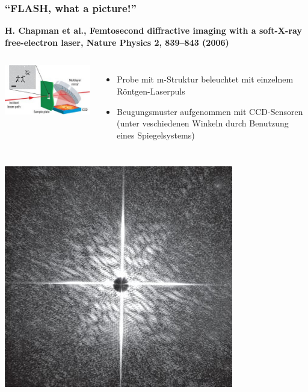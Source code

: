 \documentclass[10pt,t]{beamer}
\begin{document}
\begin{frame}
\frametitle{``FLASH, what a picture!''}
\vspace*{-2.6\baselineskip}
\alert{\bfseries\footnotesize H. Chapman et al., Femtosecond diffractive imaging with a soft-X-ray free-electron laser, Nature Physics 2, 839--843 (2006) \cite{Chapman2006}}
\vspace*{\baselineskip}
\begin{columns}[c]
\includegraphics[width=\textwidth]{flash-aufbau}
\begin{itemize}
    \item Probe mit \textmu m-Struktur beleuchtet mit einzelnem Röntgen-Laserpuls
    \item Beugungsmuster aufgenommen mit CCD-Sensoren (unter veschiedenen Winkeln durch Benutzung eines Spiegelsystems)
\end{itemize}
\end{columns}
\vspace*{1ex}
\begin{columns}[c]
\includegraphics[width=\textwidth]{flash-beugungsbild}

\end{columns}
\end{frame}
\end{document}
